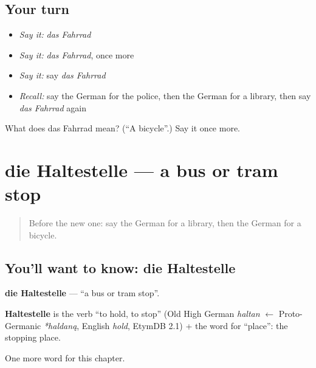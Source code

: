 \subsection*{Your turn}
\begin{itemize}
\raggedright
  \item \emph{Say it:} \emph{das Fahrrad}
  \item \emph{Say it:} \emph{das Fahrrad}, once more
  \item \emph{Say it:} say \emph{das Fahrrad}
  \item \emph{Recall:} say the German for the police, then the German for a library, then say \emph{das Fahrrad} again
\end{itemize}

\begin{tcolorbox}[breakable,colback=teal!4,colframe=teal!35!black,title={Before you move on}]
What does das Fahrrad mean? (\textquotedblleft{}A bicycle\textquotedblright{}.) Say it once more.
\end{tcolorbox}
\section[die Haltestelle]{die Haltestelle — a bus or tram stop}

\label{lesson:GE-C98-haltestelle}



\begin{quote}
Before the new one: say the German for a library, then the German for a bicycle.
\end{quote}

\subsection*{You'll want to know: die Haltestelle}
\textbf{die Haltestelle} — \textquotedblleft{}a bus or tram stop\textquotedblright{}.

\begin{cousinweb}
\textbf{Haltestelle} is the verb \textquotedblleft{}to hold, to stop\textquotedblright{} (Old High German \emph{haltan} $\leftarrow$ Proto-Germanic \emph{*haldaną}, English \emph{hold}, EtymDB 2.1) + the word for \textquotedblleft{}place\textquotedblright{}: the stopping place.
\end{cousinweb}

\begin{grammarlens}[title={What you've built}]
One more word for this chapter.
\end{grammarlens}

